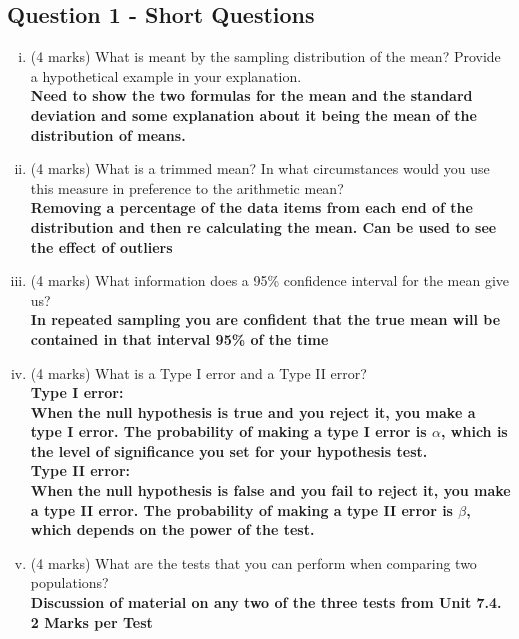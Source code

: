 \documentclass[a4paper,12pt]{article}
\begin{document}
\subsection*{Question 1 - Short Questions}
\begin{enumerate}[(i)]
	\item (4 marks) What is meant by the sampling distribution of the mean? Provide a hypothetical example in your explanation.\\
	\textbf{Need to show the two formulas for the mean and the standard deviation and
		some explanation about it being the mean of the distribution of means.}
	
	\item (4 marks) What is a trimmed mean? In what circumstances would you use this measure in preference to the arithmetic mean?\\
	\textbf{Removing a percentage of the data items from each end of the distribution and
		then re calculating the mean. Can be used to see the effect of outliers}
	\item (4 marks) What information does a 95\% confidence interval for the mean give us? \\
	\textbf{In repeated sampling you are confident that the true mean will be contained in
		that interval 95\% of the time}
	\item (4 marks) What is a Type I error and a Type II error?\\
	\textbf{Type I error:\\
		When the null hypothesis is true and you reject it, you make a type I error. The probability of making a type I error is $\alpha$, which is the level of significance you set for your hypothesis test. }\\
	\textbf{Type II error:\\
		When the null hypothesis is false and you fail to reject it, you make a type II error. The probability of making a type II error is $\beta$, which depends on the power of the test. }
	\item (4 marks) What are the tests that you can perform when comparing two populations?\\
	\textbf{Discussion of material on any two of the three tests from Unit 7.4. 2 Marks per Test}
	

\end{enumerate}
\end{document}
